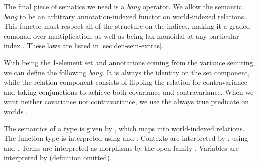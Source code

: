 The final piece of sematics we need is a \emph{bang} operator.
We allow the
semantic \emph{bang} to be an arbitrary annotation-indexed functor on
world-indexed relations.
This functor must respect all of the structure on the indices, making it a
graded comonad over multiplication, as well as being lax monoidal at any
particular index .
These laws are listed in \cref{sec:den-sem-extras}.

\begin{example}
  With  being the 1-element set and annotations coming from the
  variance semiring, we can define the following \emph{bang}.
  It is always the identity on the set component, while the relation component
  consists of flipping the relation for contravariance and taking conjunctions
  to achieve both covariance and contravariance.
  When we want neither covariance nor contravariance, we use the always true
  predicate on worlds .

\end{example}

%
%
%

The semantics of a type is given by \AgdaFunction{$\llbracket$\_$\rrbracket$},
which maps into world-indexed relations.
The function type is interpreted using  and
.
Contexts are interpreted by , using
 and .
Terms are interpreted as morphisms by the open family
\AgdaFunction{$\llbracket$\_$\vdash$\_$\rrbracket$}.
Variables are interpreted by  (definition omitted).


